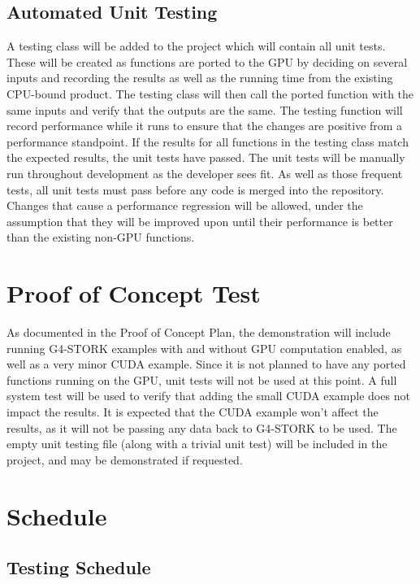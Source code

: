 \documentclass[12pt]{article}
\begin{document}
\subsection{Automated Unit Testing}
A testing class will be added to the project which will contain all unit tests. These will be created as functions are ported to the GPU by deciding on several inputs and recording the results as well as the running time from the existing CPU-bound product. The testing class will then call the ported function with the same inputs and verify that the outputs are the same. The testing function will record performance while it runs to ensure that the changes are positive from a performance standpoint. If the results for all functions in the testing class match the expected results, the unit tests have passed. The unit tests will be manually run throughout development as the developer sees fit. As well as those frequent tests, all unit tests must pass before any code is merged into the repository. Changes that cause a performance regression will be allowed, under the assumption that they will be improved upon until their performance is better than the existing non-GPU functions.

\section{Proof of Concept Test}
As documented in the Proof of Concept Plan, the demonstration will include running G4-STORK examples with and without GPU computation enabled, as well as a very minor CUDA example. Since it is not planned to have any ported functions running on the GPU, unit tests will not be used at this point. A full system test will be used to verify that adding the small CUDA example does not impact the results. It is expected that the CUDA example won't affect the results, as it will not be passing any data back to G4-STORK to be used. The empty unit testing file (along with a trivial unit test) will be included in the project, and may be demonstrated if requested.

\section{Schedule}

\subsection{Testing Schedule} %
\newpage
\end{document}
